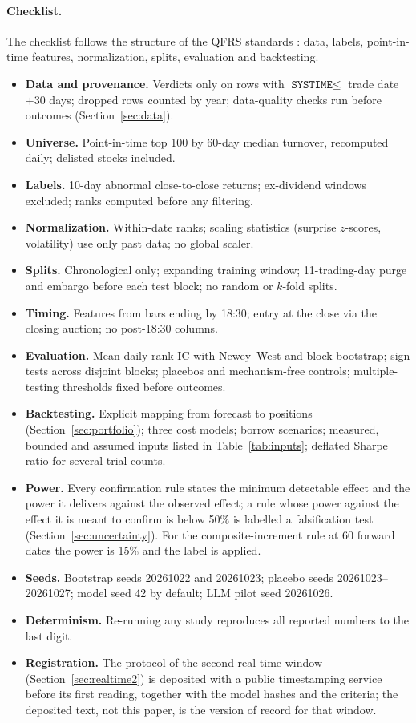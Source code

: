 \paragraph{Checklist.} The checklist follows the structure of the QFRS standards \citep{khushi2026}: data, labels, point-in-time features, normalization, splits, evaluation and backtesting.
\begin{itemize}
\item \textbf{Data and provenance.} Verdicts only on rows with $\texttt{SYSTIME}\le$ trade date $+30$ days; dropped rows counted by year; data-quality checks run before outcomes (Section~\ref{sec:data}).
\item \textbf{Universe.} Point-in-time top 100 by 60-day median turnover, recomputed daily; delisted stocks included.
\item \textbf{Labels.} 10-day abnormal close-to-close returns; ex-dividend windows excluded; ranks computed before any filtering.
\item \textbf{Normalization.} Within-date ranks; scaling statistics (surprise $z$-scores, volatility) use only past data; no global scaler.
\item \textbf{Splits.} Chronological only; expanding training window; 11-trading-day purge and embargo before each test block; no random or $k$-fold splits.
\item \textbf{Timing.} Features from bars ending by 18:30; entry at the close via the closing auction; no post-18:30 columns.
\item \textbf{Evaluation.} Mean daily rank IC with Newey--West and block bootstrap; sign tests across disjoint blocks; placebos and mechanism-free controls; multiple-testing thresholds fixed before outcomes.
\item \textbf{Backtesting.} Explicit mapping from forecast to positions (Section~\ref{sec:portfolio}); three cost models; borrow scenarios; measured, bounded and assumed inputs listed in Table~\ref{tab:inputs}; deflated Sharpe ratio for several trial counts.
\item \textbf{Power.} Every confirmation rule states the minimum detectable effect and the power it delivers against the observed effect; a rule whose power against the effect it is meant to confirm is below 50\% is labelled a falsification test (Section~\ref{sec:uncertainty}). For the composite-increment rule at 60 forward dates the power is 15\% and the label is applied.
\item \textbf{Seeds.} Bootstrap seeds 20261022 and 20261023; placebo seeds 20261023--20261027; model seed 42 by default; LLM pilot seed 20261026.
\item \textbf{Determinism.} Re-running any study reproduces all reported numbers to the last digit.
\item \textbf{Registration.} The protocol of the second real-time window (Section~\ref{sec:realtime2}) is deposited with a public timestamping service before its first reading, together with the model hashes and the criteria; the deposited text, not this paper, is the version of record for that window.
\end{itemize}
